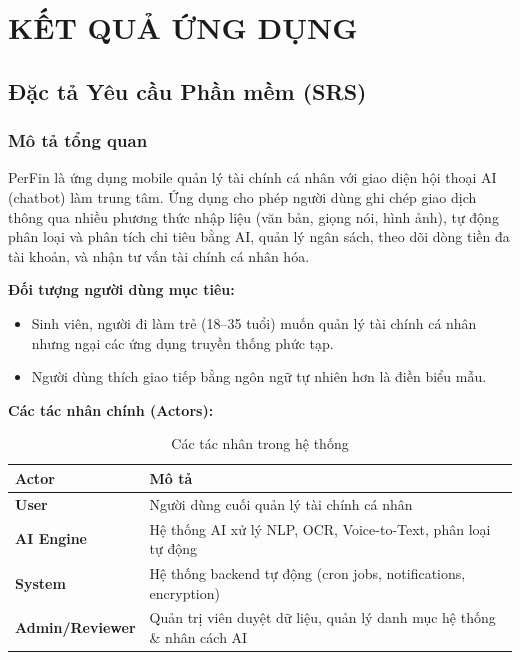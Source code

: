\chapter{KẾT QUẢ ỨNG DỤNG}
\label{ch:results}

\section{Đặc tả Yêu cầu Phần mềm (SRS)}
\label{sec:srs}

\subsection{Mô tả tổng quan}
\label{subsec:overall_description}

PerFin là ứng dụng mobile quản lý tài chính cá nhân với giao diện hội thoại AI (chatbot) làm trung tâm. Ứng dụng cho phép người dùng ghi chép giao dịch thông qua nhiều phương thức nhập liệu (văn bản, giọng nói, hình ảnh), tự động phân loại và phân tích chi tiêu bằng AI, quản lý ngân sách, theo dõi dòng tiền đa tài khoản, và nhận tư vấn tài chính cá nhân hóa.

\textbf{Đối tượng người dùng mục tiêu:}
\begin{itemize}
    \item Sinh viên, người đi làm trẻ (18--35 tuổi) muốn quản lý tài chính cá nhân nhưng ngại các ứng dụng truyền thống phức tạp.
    \item Người dùng thích giao tiếp bằng ngôn ngữ tự nhiên hơn là điền biểu mẫu.
\end{itemize}

\textbf{Các tác nhân chính (Actors):}

\begin{table}[htbp]
\centering
\begin{tabularx}{\textwidth}{|l|X|}
\hline
\textbf{Actor} & \textbf{Mô tả} \\ \hline
\textbf{User} & Người dùng cuối quản lý tài chính cá nhân \\ \hline
\textbf{AI Engine} & Hệ thống AI xử lý NLP, OCR, Voice-to-Text, phân loại tự động \\ \hline
\textbf{System} & Hệ thống backend tự động (cron jobs, notifications, encryption) \\ \hline
\textbf{Admin/Reviewer} & Quản trị viên duyệt dữ liệu, quản lý danh mục hệ thống \& nhân cách AI \\ \hline
\end{tabularx}
\caption{Các tác nhân trong hệ thống}
\label{tab:actors}
\end{table}

